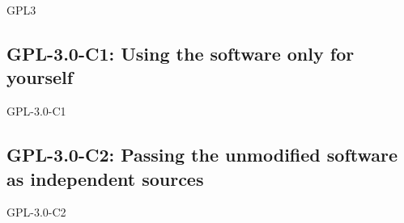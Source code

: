 
\renewcommand{\ver}{3.0}

\begin{license}{GPL3} 

\subsection{GPL-\ver-C1: Using the software only for yourself}
\begin{lsuc}{GPL-\ver-C1}

  \useCaseOne{\ver}
  \coversOne

  \begin{lsucrequiresnothing}
  \end{lsucrequiresnothing}

  \begin{lsucprohibits}
    \lsucitem{\noPatentLitigation}
  \end{lsucprohibits}
\end{lsuc}

\subsection{GPL-\ver-C2: Passing the unmodified software as independent sources}
\begin{lsuc}{GPL-\ver-C2}

  \useCaseTwo{\ver}
  \coversTwo

  \begin{lsucrequires}
    \lsucmandatory{\keepLicenseElements}
    \lsucmandatory{\gplthreeEnsureCopyrightNoticeSource}
    \lsucmandatory{\giveLicense}\passingFilesCorrectly
    \lsucmandatory{\retainCopyrightNotices}
    \lsucoptional{\addToDocumentation}
  \end{lsucrequires}

  \begin{lsucprohibits}
    \lsucitem{\noPatentLitigation}
  \end{lsucprohibits}
\end{lsuc}


\end{license}
